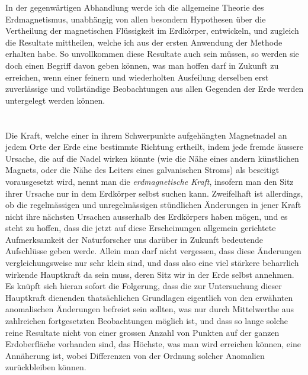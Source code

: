 \documentclass[fontsize=11pt,paper=a4,twoside,openany]{scrbook}
\begin{document}
In der gegenwärtigen Abhandlung werde ich die allgemeine Theorie des Erdmagnetismus, unabhängig von allen besondern Hypothesen über die Vertheilung der magnetischen Flüssigkeit im Erdkörper, entwickeln, und zugleich die Resultate mittheilen, welche ich aus der ersten Anwendung der Methode erhalten habe. So unvollkommen diese Resultate auch sein müssen, so werden sie doch einen Begriff davon geben können, was man hoffen darf in Zukunft zu erreichen, wenn einer feinern und wiederholten Ausfeilung derselben erst zuverlässige und vollständige Beobachtungen aus allen Gegenden der Erde werden untergelegt werden können.

\section{}

Die Kraft, welche einer in ihrem Schwerpunkte aufgehängten Magnetnadel an jedem Orte der Erde eine bestimmte Richtung ertheilt, indem jede fremde äussere Ursache, die auf die Nadel wirken könnte (wie die Nähe eines andern künstlichen Magnets, oder die Nähe des Leiters eines galvanischen Stroms) als beseitigt vorausgesetzt wird, nennt man die \textit{erdmagnetische Kraft}, insofern man den Sitz ihrer Ursache nur in dem Erdkörper selbst suchen kann. Zweifelhaft ist allerdings, ob die regelmässigen und unregelmässigen stündlichen Änderungen in jener Kraft nicht ihre nächsten Ursachen ausserhalb des Erdkörpers haben mögen, und es steht zu hoffen, dass die jetzt auf diese Erscheinungen allgemein gerichtete Aufmerksamkeit der Naturforscher uns darüber in Zukunft bedeutende Aufschlüsse geben werde. Allein man darf nicht vergessen, dass diese Änderungen vergleichungsweise nur sehr klein sind, und dass also eine viel stärkere beharrlich wirkende Hauptkraft da sein muss, deren Sitz wir in der Erde selbst annehmen. Es knüpft sich hieran sofort die Folgerung, dass die zur Untersuchung dieser Hauptkraft dienenden thatsächlichen Grundlagen eigentlich von den erwähnten anomalischen Änderungen befreiet sein sollten, was nur durch Mittelwerthe aus zahlreichen fortgesetzten Beobachtungen möglich ist, und dass so lange solche reine Resultate nicht von einer grossen Anzahl von Punkten auf der ganzen Erdoberfläche vorhanden sind, das Höchste, was man wird erreichen können, eine Annäherung ist, wobei Differenzen von der Ordnung solcher Anomalien zurückbleiben können.

\section{}
\end{document}
